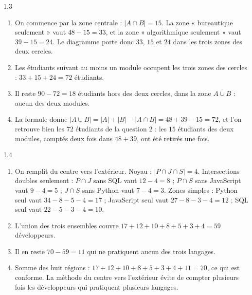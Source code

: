 \begin{corrige}{1.3}
\begin{enumerate}
\item On commence par la zone centrale : $|A \cap B| = 15$. La zone « bureautique seulement » vaut $48 - 15 = 33$, et la zone « algorithmique seulement » vaut $39 - 15 = 24$. Le diagramme porte donc $33$, $15$ et $24$ dans les trois zones des deux cercles.
\item Les étudiants suivant au moins un module occupent les trois zones des cercles : $33 + 15 + 24 = 72$ étudiants.
\item Il reste $90 - 72 = 18$ étudiants hors des deux cercles, dans la zone $\overline{A \cup B}$ : aucun des deux modules.
\item La formule donne $|A \cup B| = |A| + |B| - |A \cap B| = 48 + 39 - 15 = 72$, et l'on retrouve bien les $72$ étudiants de la question 2 : les $15$ étudiants des deux modules, comptés deux fois dans $48 + 39$, ont été retirés une fois.
\end{enumerate}
\end{corrige}

\begin{corrige}{1.4}
\begin{enumerate}
\item On remplit du centre vers l'extérieur. Noyau : $|P \cap J \cap S| = 4$. Intersections doubles seulement : $P \cap J$ sans SQL vaut $12 - 4 = 8$ ; $P \cap S$ sans JavaScript vaut $9 - 4 = 5$ ; $J \cap S$ sans Python vaut $7 - 4 = 3$. Zones simples : Python seul vaut $34 - 8 - 5 - 4 = 17$ ; JavaScript seul vaut $27 - 8 - 3 - 4 = 12$ ; SQL seul vaut $22 - 5 - 3 - 4 = 10$.
\item L'union des trois ensembles couvre $17 + 12 + 10 + 8 + 5 + 3 + 4 = 59$ développeurs.
\item Il en reste $70 - 59 = 11$ qui ne pratiquent aucun des trois langages.
\item Somme des huit régions : $17 + 12 + 10 + 8 + 5 + 3 + 4 + 11 = 70$, ce qui est conforme. La méthode du centre vers l'extérieur évite de compter plusieurs fois les développeurs qui pratiquent plusieurs langages.
\end{enumerate}
\end{corrige}

